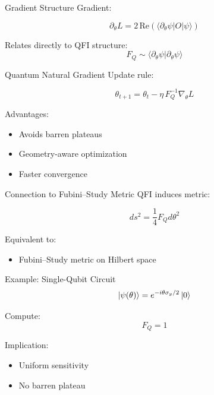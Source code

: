 \documentclass{beamer}
\begin{document}
\begin{frame}{Gradient Structure}
Gradient:

\[
\partial_\theta L 
= 2 \, \mathrm{Re} \left(
\langle \partial_\theta \psi | O | \psi \rangle
\right)
\]

\pause

Relates directly to QFI structure:
\[
F_Q \sim \langle \partial_\theta \psi | \partial_\theta \psi \rangle
\]

\end{frame}

\begin{frame}{Quantum Natural Gradient}
Update rule:

\[
\theta_{t+1}
= \theta_t - \eta \, F_Q^{-1} \nabla_\theta L
\]

\pause

Advantages:
\begin{itemize}
\item Avoids barren plateaus
\item Geometry-aware optimization
\item Faster convergence
\end{itemize}

\end{frame}

\begin{frame}{Connection to Fubini–Study Metric}
QFI induces metric:

\[
ds^2 = \frac{1}{4} F_Q d\theta^2
\]

\pause

Equivalent to:
\begin{itemize}
\item Fubini–Study metric on Hilbert space
\end{itemize}

\end{frame}

\begin{frame}{Example: Single-Qubit Circuit}
\[
\ket{\psi(\theta)} = e^{-i\theta \sigma_y/2}\ket{0}
\]

\pause

Compute:
\[
F_Q = 1
\]

\pause

Implication:
\begin{itemize}
\item Uniform sensitivity
\item No barren plateau
\end{itemize}

\end{frame}
\end{document}
